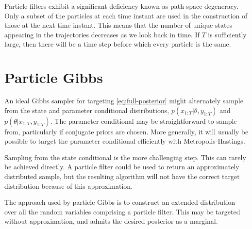 \documentclass[10pt]{article}
\newcommand{\timax}{T}
\newcommand{\pr}{\theta}
\newcommand{\ls}[1]{x_{#1}}
\newcommand{\ob}[1]{y_{#1}}
\newcommand{\den}{p}
\begin{document}
Particle filters exhibit a significant deficiency known as path-space degeneracy. Only a subset of the particles at each time instant are used in the construction of those at the next time instant. This means that the number of unique states appearing in the trajectories decreases as we look back in time. If $\timax$ is sufficiently large, then there will be a time step before which every particle is the same.



\section{Particle Gibbs}
An ideal Gibbs sampler for targeting \eqref{eq:full-posterior} might alternately sample from the state and parameter conditional distributions, $\den(\ls{1:\timax}|\pr,\ob{1:\timax})$ and $\den(\pr|\ls{1:\timax},\ob{1:\timax})$. The parameter conditional may be straightforward to sample from, particularly if conjugate priors are chosen. More generally, it will usually be possible to target the parameter conditional efficiently with Metropolis-Hastings.

Sampling from the state conditional is the more challenging step. This can rarely be achieved directly. A particle filter could be used to return an approximately distributed sample, but the resulting algorithm will not have the correct target distribution because of this approximation.

The approach used by particle Gibbs is to construct an extended distribution over all the random variables comprising a particle filter. This may be targeted without approximation, and admits the desired posterior as a marginal.
\end{document}
